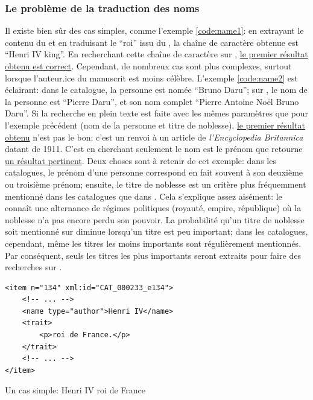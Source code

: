 \subsubsection{Le problème de la traduction des noms}
Il existe bien sûr des cas simples, comme l'exemple \ref{code:name1}: en extrayant le contenu du \tname et en traduisant le \enquote{roi} issu du \ttrait{}, la chaîne de caractère obtenue est \enquote{Henri IV king}. En recherchant cette chaîne de caractère sur \wkd{}, \href{https://www.wikidata.org/w/index.php?search=Henri+IV+king\&title=Special:Search\&profile=advanced\&fulltext=1\&ns0=1\&ns120=1}{le premier résultat obtenu est correct}. Cependant, de nombreux cas sont plus complexes, surtout lorsque l'auteur.ice du manuscrit est moins célèbre. L'exemple \ref{code:name2} est éclairant: dans le catalogue, la personne est nomée \enquote{Bruno Daru}; sur \wkd{}, le nom de la personne est \enquote{Pierre Daru}, et son nom complet \enquote{Pierre Antoine Noël Bruno Daru}. Si la recherche en plein texte est faite avec les mêmes paramètres que pour l'exemple précédent (nom de la personne et titre de noblesse), \href{https://www.wikidata.org/w/index.php?search=bruno+daru+count&title=Special:Search&profile=advanced&fulltext=1&ns0=1&ns120=1}{le premier résultat obtenu} n'est pas le bon: c'est un renvoi à un article de \textit{l'Encyclopedia Britannica} datant de 1911. C'est en cherchant seulement le nom est le prénom que \wkd{} retourne \href{https://www.wikidata.org/w/index.php?search=bruno+daru&title=Special:Search&profile=advanced&fulltext=1&ns0=1&ns120=1}{un résultat pertinent}. Deux choses sont à retenir de cet exemple: dans les catalogues, le prénom d'une personne correspond en fait souvent à son deuxième ou troisième prénom; ensuite, le titre de noblesse est un critère plus fréquemment mentionné dans les catalogues que dans \wkd{}. Cela s'explique assez aisément: le  connaît une alternance de régimes politiques (royauté, empire, république) où la noblesse n'a pas encore perdu son pouvoir. La probabilité qu'un titre de noblesse soit mentionné sur \wkd{} diminue lorsqu'un titre est peu important; dans les catalogues, cependant, même les titres les moins importants sont régulièrement mentionnés. Par conséquent, seuls les titres les plus importants seront extraits pour faire des recherches sur \wkd{}.

\begin{listing}
	\begin{verbatim}
<item n="134" xml:id="CAT_000233_e134">
	<!-- ... -->
	<name type="author">Henri IV</name>
	<trait>
		<p>roi de France.</p>
	</trait>
	<!-- ... -->
</item>
	\end{verbatim}
	\caption{Un cas simple: Henri IV roi de France}
	\label{code:name1}
\end{listing}

